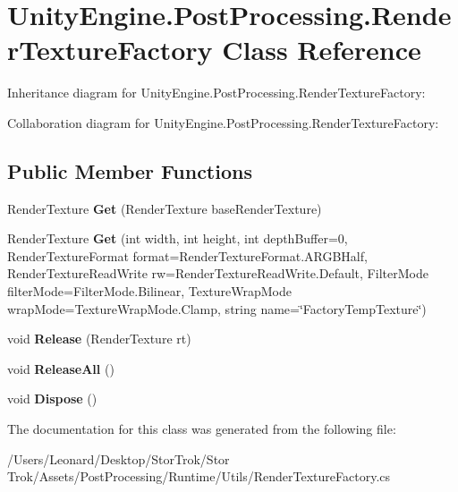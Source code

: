 \hypertarget{class_unity_engine_1_1_post_processing_1_1_render_texture_factory}{}\section{Unity\+Engine.\+Post\+Processing.\+Render\+Texture\+Factory Class Reference}
\label{class_unity_engine_1_1_post_processing_1_1_render_texture_factory}


Inheritance diagram for Unity\+Engine.\+Post\+Processing.\+Render\+Texture\+Factory\+:


Collaboration diagram for Unity\+Engine.\+Post\+Processing.\+Render\+Texture\+Factory\+:
\subsection*{Public Member Functions}
\begin{DoxyCompactItemize}
\item 
\mbox{\label{class_unity_engine_1_1_post_processing_1_1_render_texture_factory_a66f2ee62b9248b0d50c8c4792b893cbd}} 
Render\+Texture {\bfseries Get} (Render\+Texture base\+Render\+Texture)
\item 
\mbox{\label{class_unity_engine_1_1_post_processing_1_1_render_texture_factory_aaf1c6deb2c4bdc1cc30f9c22243f5ab8}} 
Render\+Texture {\bfseries Get} (int width, int height, int depth\+Buffer=0, Render\+Texture\+Format format=Render\+Texture\+Format.\+A\+R\+G\+B\+Half, Render\+Texture\+Read\+Write rw=Render\+Texture\+Read\+Write.\+Default, Filter\+Mode filter\+Mode=Filter\+Mode.\+Bilinear, Texture\+Wrap\+Mode wrap\+Mode=Texture\+Wrap\+Mode.\+Clamp, string name=\char`\"{}Factory\+Temp\+Texture\char`\"{})
\item 
\mbox{\label{class_unity_engine_1_1_post_processing_1_1_render_texture_factory_a056c901a6186ae99274acbbd099ee76a}} 
void {\bfseries Release} (Render\+Texture rt)
\item 
\mbox{\label{class_unity_engine_1_1_post_processing_1_1_render_texture_factory_a6f5d4a6beda0674159c229f8b3a9a116}} 
void {\bfseries Release\+All} ()
\item 
\mbox{\label{class_unity_engine_1_1_post_processing_1_1_render_texture_factory_aff8e64c17598aa2633a075e3975b0efc}} 
void {\bfseries Dispose} ()
\end{DoxyCompactItemize}


The documentation for this class was generated from the following file\+:\begin{DoxyCompactItemize}
\item 
/\+Users/\+Leonard/\+Desktop/\+Stor\+Trok/\+Stor Trok/\+Assets/\+Post\+Processing/\+Runtime/\+Utils/Render\+Texture\+Factory.\+cs\end{DoxyCompactItemize}
